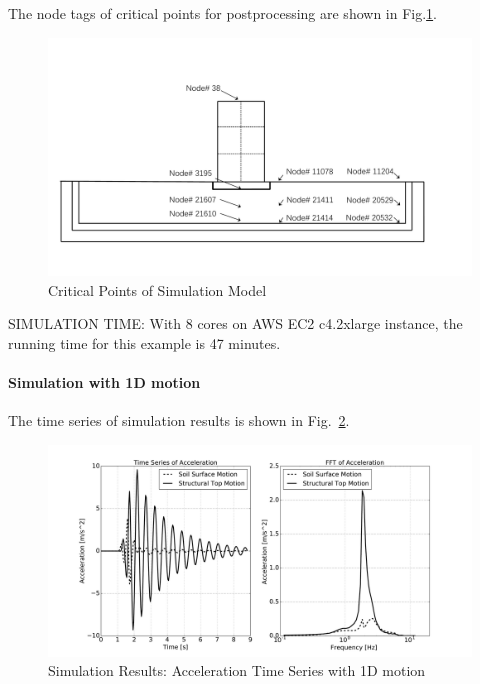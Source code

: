 The node tags of critical points for postprocessing are shown in Fig.\ref{fig_points_3D_motion_3D_model_results_structure}.

\begin{figure}[H]
  \centering
  \includegraphics[width = 12cm]{./Figure-files/nonlinear_analysis_steps/soil-structure/soil-structure_node_location.pdf}
  \caption{Critical Points of Simulation Model}
  \label{fig_points_3D_motion_3D_model_results_structure}
\end{figure}

SIMULATION TIME: With 8 cores on AWS EC2 c4.2xlarge instance, the running time for this example is 47 minutes.

\paragraph{Simulation with 1D motion }
The time series of simulation results is shown in Fig.~\ref{fig_decon_3D_motion_1D_model_results_top_bottom_time_series_ssi3d_1D_motion}.
\begin{figure}[H]
  \centering
  \includegraphics[width = 15cm]{./Figure-files/nonlinear_analysis_steps/soil-structure-1D-ans/shell_structure_motion_node_38_x_acce_compare.pdf}
  \caption{Simulation Results: Acceleration Time Series with 1D motion}
  \label{fig_decon_3D_motion_1D_model_results_top_bottom_time_series_ssi3d_1D_motion}
\end{figure}

